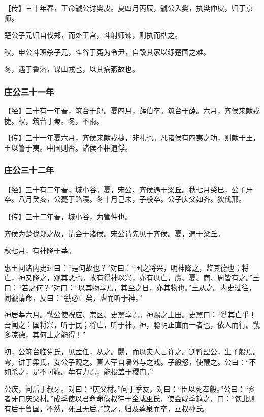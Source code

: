 \documentclass[]{article}
\begin{document}
【传】三十年春，王命虢公讨樊皮。夏四月丙辰，虢公入樊，执樊仲皮，归于京师。

楚公子元归自伐郑，而处王宫，斗射师谏，则执而梏之。

秋，申公斗班杀子元，斗谷于菟为令尹，自毁其家以纾楚国之难。

冬，遇于鲁济，谋山戎也，以其病燕故也。

\hypertarget{header-n594}{%
\subsubsection{庄公三十一年}\label{header-n594}}

【经】三十有一年春，筑台于郎。夏四月，薛伯卒。筑台于薛。六月，齐侯来献戎捷。秋，筑台于秦。冬，不雨。

【传】三十一年夏六月，齐侯来献戎捷，非礼也。凡诸侯有四夷之功，则献于王，王以警于夷。中国则否。诸侯不相遗俘。

\hypertarget{header-n599}{%
\subsubsection{庄公三十二年}\label{header-n599}}

【经】三十有二年春，城小谷。夏，宋公、齐侯遇于梁丘。秋七月癸巳，公子牙卒。八月癸亥，公薨于路寝。冬十月己未，子般卒。公子庆父如齐。狄伐邢。

【传】三十二年春，城小谷，为管仲也。

齐侯为楚伐郑之故，请会于诸侯。宋公请先见于齐侯。夏，遇于梁丘。

秋七月，有神降于莘。

惠王问诸内史过曰：``是何故也？''对曰：``国之将兴，明神降之，监其德也；将亡，神又降之，观其恶也。故有得神以兴，亦有以亡，虞、夏、商、周皆有之。''王曰：``若之何？''对曰：``以其物享焉，其至之日，亦其物也。''王从之。内史过往，闻虢请命，反曰：``虢必亡矣，虐而听于神。''

神居莘六月。虢公使祝应、宗区、史嚚享焉。神赐之土田。史嚚曰：``虢其亡乎！吾闻之：国将兴，听于民；将亡，听于神。神，聪明正直而一者也，依人而行。虢多凉德，其何土之能得！''

初，公筑台临党氏，见孟任，从之。閟，而以夫人言许之。割臂盟公，生子般焉。雩，讲于梁氏，女公子观之。圉人荦自墙外与之戏。子般怒，使鞭之。公曰：``不如杀之，是不可鞭。荦有力焉，能投盖于稷门。''

公疾，问后于叔牙。对曰：``庆父材。''问于季友，对曰：``臣以死奉般。''公曰：``乡者牙曰庆父材。''成季使以君命命僖叔待于金咸巫氏，使金咸季鸩之，曰：``饮此则有后于鲁国，不然，死且无后。''饮之，归及逵泉而卒，立叔孙氏。
\end{document}
